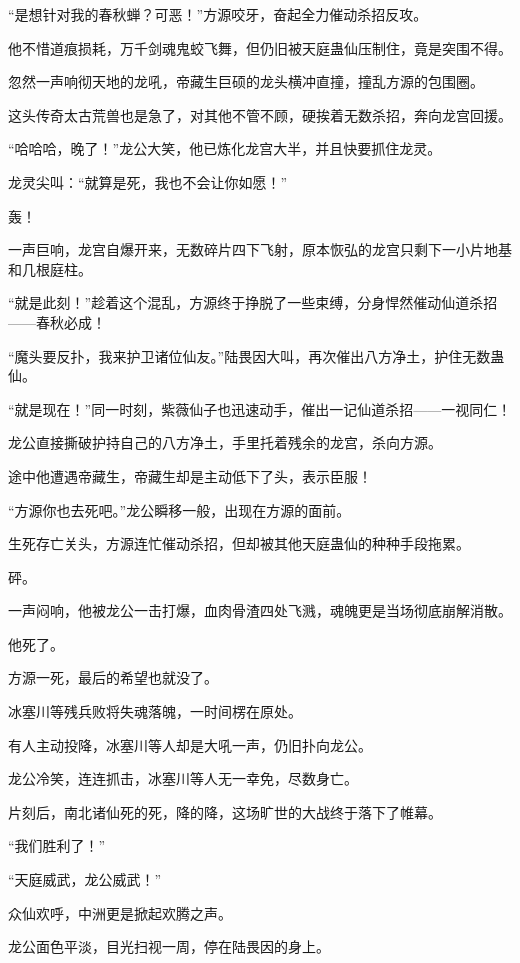 \begin{this_body}
“是想针对我的春秋蝉？可恶！”方源咬牙，奋起全力催动杀招反攻。

他不惜道痕损耗，万千剑魂鬼蛟飞舞，但仍旧被天庭蛊仙压制住，竟是突围不得。

忽然一声响彻天地的龙吼，帝藏生巨硕的龙头横冲直撞，撞乱方源的包围圈。

这头传奇太古荒兽也是急了，对其他不管不顾，硬挨着无数杀招，奔向龙宫回援。

“哈哈哈，晚了！”龙公大笑，他已炼化龙宫大半，并且快要抓住龙灵。

龙灵尖叫：“就算是死，我也不会让你如愿！”

轰！

一声巨响，龙宫自爆开来，无数碎片四下飞射，原本恢弘的龙宫只剩下一小片地基和几根庭柱。

“就是此刻！”趁着这个混乱，方源终于挣脱了一些束缚，分身悍然催动仙道杀招——春秋必成！

“魔头要反扑，我来护卫诸位仙友。”陆畏因大叫，再次催出八方净土，护住无数蛊仙。

“就是现在！”同一时刻，紫薇仙子也迅速动手，催出一记仙道杀招——一视同仁！

龙公直接撕破护持自己的八方净土，手里托着残余的龙宫，杀向方源。

途中他遭遇帝藏生，帝藏生却是主动低下了头，表示臣服！

“方源你也去死吧。”龙公瞬移一般，出现在方源的面前。

生死存亡关头，方源连忙催动杀招，但却被其他天庭蛊仙的种种手段拖累。

砰。

一声闷响，他被龙公一击打爆，血肉骨渣四处飞溅，魂魄更是当场彻底崩解消散。

他死了。

方源一死，最后的希望也就没了。

冰塞川等残兵败将失魂落魄，一时间楞在原处。

有人主动投降，冰塞川等人却是大吼一声，仍旧扑向龙公。

龙公冷笑，连连抓击，冰塞川等人无一幸免，尽数身亡。

片刻后，南北诸仙死的死，降的降，这场旷世的大战终于落下了帷幕。

“我们胜利了！”

“天庭威武，龙公威武！”

众仙欢呼，中洲更是掀起欢腾之声。

龙公面色平淡，目光扫视一周，停在陆畏因的身上。


\end{this_body}
